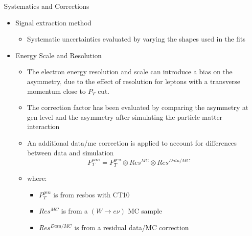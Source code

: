 \documentclass[t, 8pt]{beamer}
\begin{document}
\begin{frame}{Systematics and Corrections}
  \begin{itemize}
    \item Signal extraction method
    \begin{itemize}
      \item Systematic uncertainties evaluated by varying the shapes used in the fits
    \end{itemize}
    \item Energy Scale and Resolution
    \begin{itemize}
      \item The electron energy resolution and scale can introduce a bias on the
      asymmetry, due to the effect of resolution for leptons with a transverse
      momentum close to $P_T$ cut.
      \item The correction factor has been evaluated by comparing the asymmetry at gen level and the asymmetry after simulating the particle-matter interaction
      \item An additional data/mc correction is applied to account for differences between data and simulation
      \begin{equation}
      P_T^{sim} = P_T^{gen} \otimes Res^{MC} \otimes Res^{Data/MC}
      \end{equation}
      \item where:
      \begin{itemize} 
        \item $P_T^{gen}$ is from resbos with CT10
        \item $Res^{MC}$ is from a $(W\to e\nu)$ MC sample
        \item $Res^{Data/MC}$ is from a residual data/MC correction 
      \end{itemize}
    \end{itemize}
  \end{itemize}
\end{frame}
\end{document}
